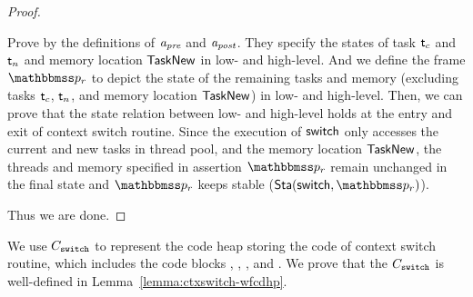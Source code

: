 {\begin{proof}
\begin{itemize}
        Prove by the definitions of $\textit{a}_\textit{pre}$ and $\textit{a}_\textit{post}$. 
        They specify the states of task $\textsf{t}_c$ and 
        $\textsf{t}_n$ and memory location $\mathsf{TaskNew}$
        in low- and high-level. And we define the frame 
        $\relastP_r$ to depict the state of the 
        remaining tasks and memory 
        (excluding tasks $\textsf{t}_c$, $\textsf{t}_n$, and 
        memory location $\mathsf{TaskNew}$) in low- and high-level.
        Then, we can prove that the 
        state relation between low- and high-level 
        holds at the entry and 
        exit of context switch routine. 
        Since the execution of $\mathsf{switch}$ only accesses 
        the current and new tasks in thread pool, and the 
        memory location $\mathsf{TaskNew}$, 
        the threads and memory specified in assertion 
        $\relastP_r$ remain unchanged 
        in the final state and $\relastP_r$ keeps 
        stable ($\Sta(\primsw, \relastP_r)$).
    \end{itemize}
    Thus we are done. 
\end{proof}

We use $C_{\texttt{switch}}$ to represent the 
code heap storing the code of context switch routine, 
which includes the code blocks \SwitchEntry{}, 
\regsave{}, \regrestore{}, 
\SaveUsedWin{} and \SwitchNewTask{}. We prove that 
the $C_{\texttt{switch}}$ is well-defined in 
Lemma~\ref{lemma:ctxswitch-wfcdhp}.

}
